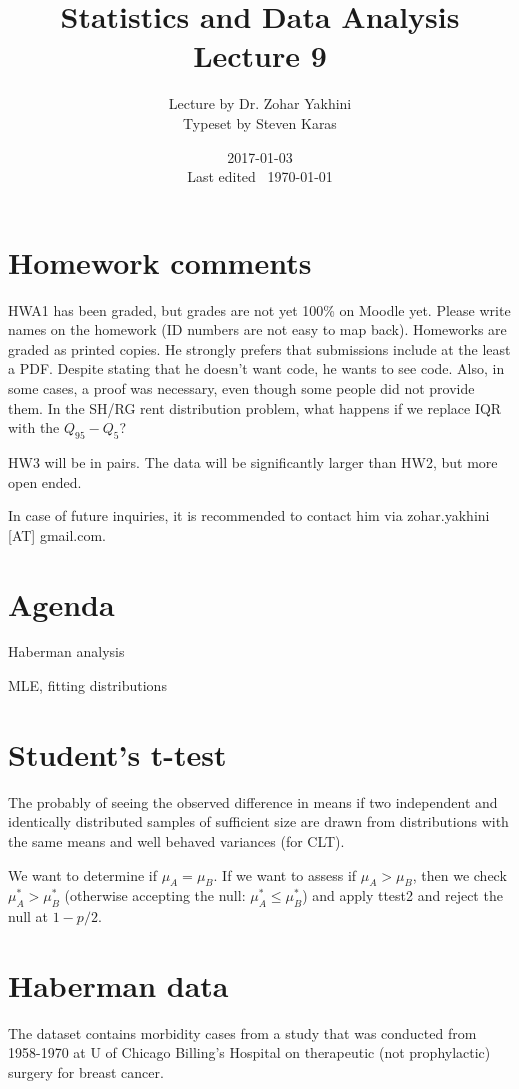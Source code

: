 \documentclass[a4paper]{article}
\title{Statistics and Data Analysis\\\large Lecture 9}
\date{2017-01-03 \\ Last edited \currenttime\ \today}
\author{Lecture by Dr. Zohar Yakhini\\Typeset by Steven Karas}
\newenvironment{enumerate*}%
  {\begin{enumerate}%
    \setlength{\itemsep}{0.5pt}%
    \setlength{\parsep}{0pt}%
    \setlength{\parskip}{0pt}}%
  {\end{enumerate}}
\begin{document}
\maketitle

\section{Homework comments}
HWA1 has been graded, but grades are not yet 100\% on Moodle yet.
Please write names on the homework (ID numbers are not easy to map back).
Homeworks are graded as printed copies. He strongly prefers that submissions include at the least a PDF.
Despite stating that he doesn't want code, he wants to see code.
Also, in some cases, a proof was necessary, even though some people did not provide them.
In the SH/RG rent distribution problem, what happens if we replace IQR with the $Q_{95} - Q_5$?

HW3 will be in pairs. The data will be significantly larger than HW2, but more open ended.

In case of future inquiries, it is recommended to contact him via zohar.yakhini [AT] gmail.com.

\section{Agenda}

\begin{enumerate*}
  \item Haberman analysis
  \item MLE, fitting distributions
\end{enumerate*}

\section{Student's t-test}
The probably of seeing the observed difference in means if two independent and identically distributed samples of sufficient size are drawn from distributions with the same means and well behaved variances (for CLT).

We want to determine if $\mu_A = \mu_B$. If we want to assess if $\mu_A > \mu_B$, then we check $\mu_A^* > \mu_B^*$ (otherwise accepting the null: $\mu_A^* \le \mu_B^*$) and apply ttest2 and reject the null at $1-p/2$.

\section{Haberman data}
The dataset contains morbidity cases from a study that was conducted from 1958-1970 at U of Chicago Billing's Hospital on therapeutic (not prophylactic) surgery for breast cancer.
\end{document}
